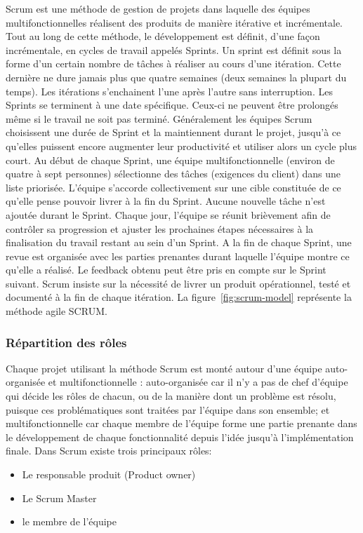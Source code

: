 Scrum est une méthode de gestion de projets dans laquelle des équipes
multifonctionnelles réalisent des produits de manière itérative et incrémentale.
Tout au long de cette méthode, le développement est définit, d'une façon
incrémentale, en cycles de travail appelés Sprints. Un sprint est définit sous
la forme d'un certain nombre de tâches à réaliser au cours d'une itération.
Cette dernière ne dure jamais plus que quatre semaines (deux semaines la
plupart du temps). Les itérations s'enchainent l'une après l'autre sans
interruption. Les Sprints se terminent à une date spécifique. Ceux-ci ne
peuvent être prolongés même si le travail ne soit pas terminé. Généralement les équipes
Scrum choisissent une durée de Sprint et la maintiennent durant le projet, jusqu'à ce
qu'elles puissent encore augmenter leur productivité et utiliser alors un cycle plus court.
Au début de chaque Sprint, une équipe multifonctionnelle (environ de quatre à sept
personnes) sélectionne des tâches (exigences du client) dans une liste priorisée.
L'équipe s'accorde collectivement sur une cible constituée de ce qu'elle pense pouvoir
livrer à la fin du Sprint. Aucune nouvelle tâche n'est ajoutée durant le Sprint. Chaque
jour, l'équipe se réunit brièvement afin de contrôler sa progression et ajuster les
prochaines étapes nécessaires à la finalisation du travail restant au sein d'un Sprint. A la
fin de chaque Sprint, une revue est organisée avec les parties prenantes durant laquelle
l'équipe montre ce qu'elle a réalisé. Le feedback obtenu peut être pris en compte sur le
Sprint suivant.
Scrum insiste sur la nécessité de livrer un produit opérationnel, testé et
documenté à la fin de chaque itération.
La figure~\ref{fig:scrum-model} représente la méthode agile SCRUM. 



\subsubsection{Répartition des rôles}

Chaque projet utilisant la méthode Scrum est monté autour d'une équipe auto-
organisée et multifonctionnelle : auto-organisée car il n'y a pas de chef d'équipe qui
décide les rôles de chacun, ou de la manière dont un problème est résolu, puisque ces
problématiques sont traitées par l'équipe dans son ensemble; et multifonctionnelle car
chaque membre de l'équipe forme une partie prenante dans le développement de
chaque fonctionnalité depuis l'idée jusqu'à l'implémentation finale.
Dans Scrum existe trois principaux rôles:
\begin{itemize}
 \item Le responsable produit (Product owner)
 \item Le Scrum Master
 \item le membre de l'équipe
\end{itemize}

